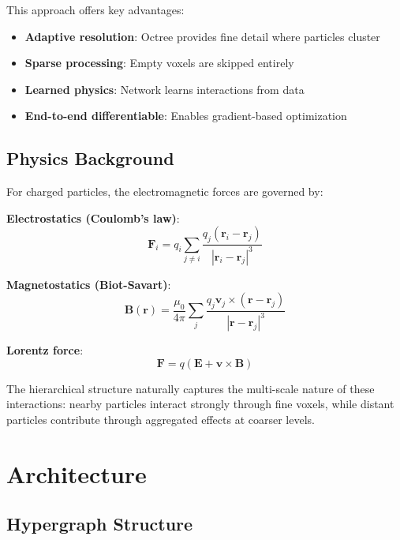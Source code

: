 \documentclass[11pt,a4paper]{article}
\begin{document}
This approach offers key advantages:
\begin{itemize}
    \item \textbf{Adaptive resolution}: Octree provides fine detail where particles cluster
    \item \textbf{Sparse processing}: Empty voxels are skipped entirely
    \item \textbf{Learned physics}: Network learns interactions from data
    \item \textbf{End-to-end differentiable}: Enables gradient-based optimization
\end{itemize}

\subsection{Physics Background}

For charged particles, the electromagnetic forces are governed by:

\textbf{Electrostatics (Coulomb's law)}:
\begin{equation}
    \mathbf{F}_i = q_i \sum_{j \neq i} \frac{q_j (\mathbf{r}_i - \mathbf{r}_j)}{|\mathbf{r}_i - \mathbf{r}_j|^3}
\end{equation}

\textbf{Magnetostatics (Biot-Savart)}:
\begin{equation}
    \mathbf{B}(\mathbf{r}) = \frac{\mu_0}{4\pi} \sum_j \frac{q_j \mathbf{v}_j \times (\mathbf{r} - \mathbf{r}_j)}{|\mathbf{r} - \mathbf{r}_j|^3}
\end{equation}

\textbf{Lorentz force}:
\begin{equation}
    \mathbf{F} = q(\mathbf{E} + \mathbf{v} \times \mathbf{B})
\end{equation}

The hierarchical structure naturally captures the multi-scale nature of these interactions: nearby particles interact strongly through fine voxels, while distant particles contribute through aggregated effects at coarser levels.

\section{Architecture}

\subsection{Hypergraph Structure}
\end{document}
